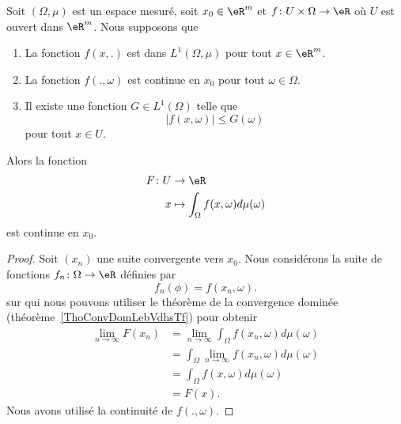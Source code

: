 \begin{theorem} \label{ThoKnuSNd}
    Soit \( (\Omega,\mu)\) est un espace mesuré, soit \( x_0\in \eR^m\) et \( f\colon U\times \Omega\to \eR\) où \( U\) est ouvert dans \( \eR^m\). Nous supposons que
    \begin{enumerate}
        \item
            La fonction \( f(x,.)\) est dans \( L^1(\Omega,\mu)\) pour tout \( x \in \eR^m\).
        \item
            La fonction \( f(.,\omega)\) est continue en \( x_0\) pour tout \( \omega\in\Omega\).
        \item       \label{ItemNAuYNG}
            Il existe une fonction \( G\in L^1(\Omega)\) telle que
            \begin{equation}
                | f(x,\omega) |\leq G(\omega)
            \end{equation}
            pour tout \( x\in U\).
    \end{enumerate}
    Alors la fonction
    \begin{equation}
        \begin{aligned}
            F\colon U&\to \eR \\
            x&\mapsto \int_{\Omega}f(x,\omega)d\mu(\omega)
        \end{aligned}
    \end{equation}
    est continue en \( x_0\).
\end{theorem}

\begin{proof}
    Soit \( (x_n)\) une suite convergente vers \( x_0\). Nous considérons la suite de fonctions \( f_n\colon \Omega\to \eR\) définies par
    \begin{equation}
        f_n(\phi)=f(x_n,\omega).
    \end{equation}
    sur qui nous pouvons utiliser le théorème de la convergence dominée (théorème~\ref{ThoConvDomLebVdhsTf}) pour obtenir
    \begin{subequations}
        \begin{align}
            \lim_{n\to \infty} F(x_n)&=\lim_{n\to \infty} \int_{\Omega}f(x_n,\omega)d\mu(\omega)\\
            &=\int_{\Omega}\lim_{n\to \infty} f(x_n,\omega)d\mu(\omega)\\
            &=\int_{\Omega}f(x,\omega)d\mu(\omega)\\
            &=F(x).
        \end{align}
    \end{subequations}
    Nous avons utilisé la continuité de \( f(.,\omega)\).
\end{proof}


